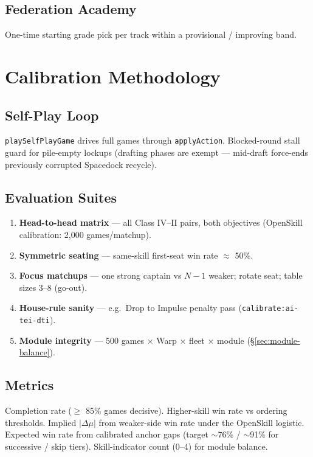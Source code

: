 \documentclass[11pt,letterpaper]{article}
\begin{document}
\subsection{Federation Academy}
One-time starting grade pick per track within a provisional / improving band.

\section{Calibration Methodology}

\subsection{Self-Play Loop}
\texttt{playSelfPlayGame} drives full games through \texttt{applyAction}. Blocked-round stall guard for pile-empty lockups (drafting phases are exempt --- mid-draft force-ends previously corrupted Spacedock recycle).

\subsection{Evaluation Suites}
\begin{enumerate}
\item \textbf{Head-to-head matrix} --- all Class IV--II pairs, both objectives (OpenSkill calibration: 2{,}000 games/matchup).
\item \textbf{Symmetric seating} --- same-skill first-seat win rate $\approx$ 50\%.
\item \textbf{Focus matchups} --- one strong captain vs $N-1$ weaker; rotate seat; table sizes 3--8 (go-out).
\item \textbf{House-rule sanity} --- e.g.\ Drop to Impulse penalty pass (\texttt{calibrate:ai-tei-dti}).
\item \textbf{Module integrity} --- 500 games $\times$ Warp $\times$ fleet $\times$ module (\S\ref{sec:module-balance}).
\end{enumerate}

\subsection{Metrics}
Completion rate ($\geq$ 85\% games decisive). Higher-skill win rate vs ordering thresholds. Implied $|\Delta\mu|$ from weaker-side win rate under the OpenSkill logistic. Expected win rate from calibrated anchor gaps (target $\sim$76\% / $\sim$91\% for successive / skip tiers). Skill-indicator count (0--4) for module balance.
\end{document}
